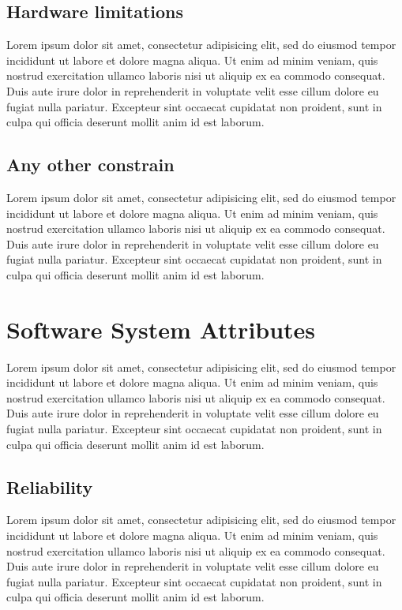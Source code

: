 \documentclass{report}
\begin{document}
	
	\subsection{Hardware limitations}
	Lorem ipsum dolor sit amet, consectetur adipisicing elit, sed do eiusmod
	tempor incididunt ut labore et dolore magna aliqua. Ut enim ad minim veniam,
	quis nostrud exercitation ullamco laboris nisi ut aliquip ex ea commodo
	consequat. Duis aute irure dolor in reprehenderit in voluptate velit esse
	cillum dolore eu fugiat nulla pariatur. Excepteur sint occaecat cupidatat non
	proident, sunt in culpa qui officia deserunt mollit anim id est laborum.
	
	
	\subsection{Any other constrain}
	Lorem ipsum dolor sit amet, consectetur adipisicing elit, sed do eiusmod
	tempor incididunt ut labore et dolore magna aliqua. Ut enim ad minim veniam,
	quis nostrud exercitation ullamco laboris nisi ut aliquip ex ea commodo
	consequat. Duis aute irure dolor in reprehenderit in voluptate velit esse
	cillum dolore eu fugiat nulla pariatur. Excepteur sint occaecat cupidatat non
	proident, sunt in culpa qui officia deserunt mollit anim id est laborum.
	
	
	\section{Software System Attributes}
	Lorem ipsum dolor sit amet, consectetur adipisicing elit, sed do eiusmod
	tempor incididunt ut labore et dolore magna aliqua. Ut enim ad minim veniam,
	quis nostrud exercitation ullamco laboris nisi ut aliquip ex ea commodo
	consequat. Duis aute irure dolor in reprehenderit in voluptate velit esse
	cillum dolore eu fugiat nulla pariatur. Excepteur sint occaecat cupidatat non
	proident, sunt in culpa qui officia deserunt mollit anim id est laborum.
	
	
	\subsection{Reliability}
	Lorem ipsum dolor sit amet, consectetur adipisicing elit, sed do eiusmod
	tempor incididunt ut labore et dolore magna aliqua. Ut enim ad minim veniam,
	quis nostrud exercitation ullamco laboris nisi ut aliquip ex ea commodo
	consequat. Duis aute irure dolor in reprehenderit in voluptate velit esse
	cillum dolore eu fugiat nulla pariatur. Excepteur sint occaecat cupidatat non
	proident, sunt in culpa qui officia deserunt mollit anim id est laborum.
	
\end{document}
